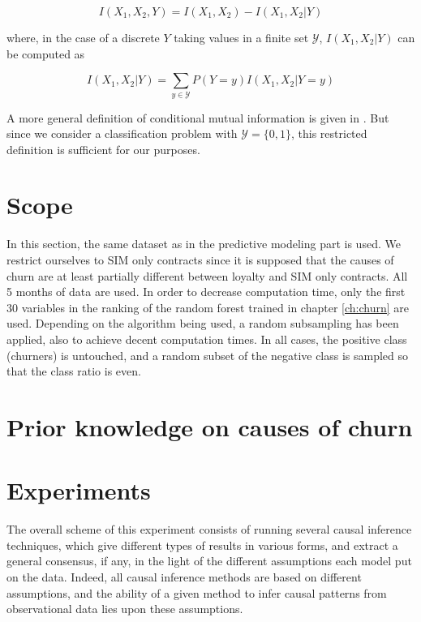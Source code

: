 \begin{equation}
    \label{eq:int_cond}
    I(X_1, X_2, Y) = I(X_1, X_2) - I(X_1, X_2 | Y)
\end{equation}

where, in the case of a discrete $Y$ taking values in a finite set $\mathcal
Y$, $I(X_1, X_2 | Y)$ can be computed as

\begin{equation}
    \label{eq:int_cond_sum}
    I(X_1, X_2 | Y) = \sum_{y\in\mathcal Y}P(Y=y)I(X_1, X_2 | Y = y)
\end{equation}

A more general definition of conditional mutual information is given in
\parencite{cover2012elements}. But since we consider a classification problem
with $\mathcal Y = \{0, 1\}$, this restricted definition is sufficient for our
purposes.

\section{Scope}

In this section, the same dataset as in the predictive modeling part is used. We
restrict ourselves to SIM only contracts since it is supposed that the causes
of churn are at least partially different between loyalty and SIM only
contracts. All 5 months of data are used. In order to decrease computation time,
only the first 30 variables in the ranking of the random forest trained in
chapter \ref{ch:churn} are used. Depending on the algorithm being used, a random
subsampling has been applied, also to achieve decent computation times. In all
cases, the positive class (churners) is untouched, and a random subset of the
negative class is sampled so that the class ratio is even.

\section{Prior knowledge on causes of churn}

\section{Experiments}
\label{sec:causal_experiments}

The overall scheme of this experiment consists of running several causal
inference techniques, which give different types of results in various forms,
and extract a general consensus, if any, in the light of the different
assumptions each model put on the data. Indeed, all causal inference methods are
based on different assumptions, and the ability of a given method to infer
causal patterns from observational data lies upon these assumptions.

